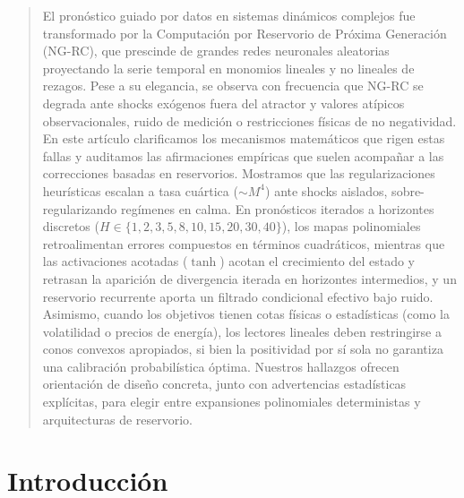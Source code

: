 \documentclass[aip,cha,reprint,amsmath,amssymb]{revtex4-2}
\begin{document}
\maketitle

\begin{quotation}
El pronóstico guiado por datos en sistemas dinámicos complejos fue transformado por la Computación por Reservorio de Próxima Generación (NG-RC), que prescinde de grandes redes neuronales aleatorias proyectando la serie temporal en monomios lineales y no lineales de rezagos. Pese a su elegancia, se observa con frecuencia que NG-RC se degrada ante shocks exógenos fuera del atractor y valores atípicos observacionales, ruido de medición o restricciones físicas de no negatividad. En este artículo clarificamos los mecanismos matemáticos que rigen estas fallas y auditamos las afirmaciones empíricas que suelen acompañar a las correcciones basadas en reservorios. Mostramos que las regularizaciones heurísticas escalan a tasa cuártica ($\sim M^4$) ante shocks aislados, sobre-regularizando regímenes en calma. En pronósticos iterados a horizontes discretos ($H \in \{1,2,3,5,8,10,15,20,30,40\}$), los mapas polinomiales retroalimentan errores compuestos en términos cuadráticos, mientras que las activaciones acotadas ($\tanh$) acotan el crecimiento del estado y retrasan la aparición de divergencia iterada en horizontes intermedios, y un reservorio recurrente aporta un filtrado condicional efectivo bajo ruido. Asimismo, cuando los objetivos tienen cotas físicas o estadísticas (como la volatilidad o precios de energía), los lectores lineales deben restringirse a conos convexos apropiados, si bien la positividad por sí sola no garantiza una calibración probabilística óptima. Nuestros hallazgos ofrecen orientación de diseño concreta, junto con advertencias estadísticas explícitas, para elegir entre expansiones polinomiales deterministas y arquitecturas de reservorio.
\end{quotation}

\section{Introducción}
\label{sec:intro}
\end{document}
